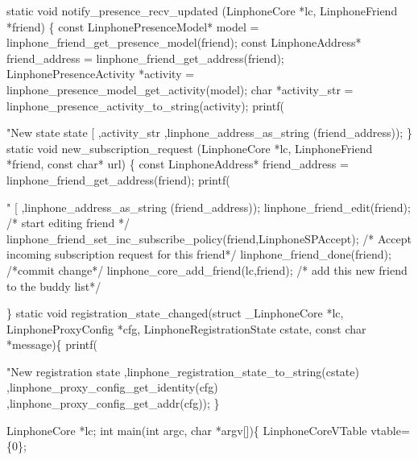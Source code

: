 \begin{DoxyCodeInclude}
\textcolor{keyword}{static} \textcolor{keywordtype}{void} notify\_presence\_recv\_updated (LinphoneCore *lc,  LinphoneFriend *\textcolor{keyword}{friend}) \{
        \textcolor{keyword}{const} LinphonePresenceModel* model = linphone_friend_get_presence_model(\textcolor{keyword}{friend});
        \textcolor{keyword}{const} LinphoneAddress* friend\_address = linphone_friend_get_address(\textcolor{keyword}{friend});
        LinphonePresenceActivity *activity = 
      linphone_presence_model_get_activity(model);
        \textcolor{keywordtype}{char} *activity\_str = linphone_presence_activity_to_string(activity);
        printf(\textcolor{stringliteral}{"New state state [%
                                ,activity\_str
                                ,linphone_address_as_string (friend\_address));
\}
\textcolor{keyword}{static} \textcolor{keywordtype}{void} new\_subscription\_request (LinphoneCore *lc,  LinphoneFriend *\textcolor{keyword}{friend}, \textcolor{keyword}{const} \textcolor{keywordtype}{char}* url) \{
        \textcolor{keyword}{const} LinphoneAddress* friend\_address = linphone_friend_get_address(\textcolor{keyword}{friend});
        printf(\textcolor{stringliteral}{" [%
                                ,linphone_address_as_string (friend\_address));
        linphone_friend_edit(\textcolor{keyword}{friend}); \textcolor{comment}{/* start editing friend */}
        linphone_friend_set_inc_subscribe_policy(\textcolor{keyword}{friend},LinphoneSPAccept); \textcolor{comment}{/* Accept incoming subscription
       request for this friend*/}
        linphone_friend_done(\textcolor{keyword}{friend}); \textcolor{comment}{/*commit change*/}
        linphone_core_add_friend(lc,\textcolor{keyword}{friend}); \textcolor{comment}{/* add this new friend to the buddy list*/}

\}
\textcolor{keyword}{static} \textcolor{keywordtype}{void} registration\_state\_changed(\textcolor{keyword}{struct} \_LinphoneCore *lc, 
      LinphoneProxyConfig *cfg, LinphoneRegistrationState cstate, \textcolor{keyword}{const} \textcolor{keywordtype}{char} *message)\{
                printf(\textcolor{stringliteral}{"New registration state %
                                ,linphone_registration_state_to_string(cstate)
                                ,linphone_proxy_config_get_identity(cfg)
                                ,linphone_proxy_config_get_addr(cfg));
\}

LinphoneCore *lc;
\textcolor{keywordtype}{int} main(\textcolor{keywordtype}{int} argc, \textcolor{keywordtype}{char} *argv[])\{
        LinphoneCoreVTable vtable=\{0\};

}}}
\end{DoxyCodeInclude}
